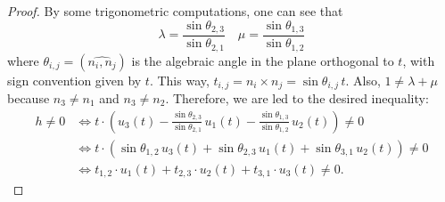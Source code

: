 \documentclass[11pt]{article}
\theoremstyle{plain}
\theoremstyle{definition}
\theoremstyle{remark}
\begin{document}
\begin{proof}
		By some trigonometric computations, one can see that
		\[\lambda = \frac{\sin \theta_{2,3}}{\sin \theta_{2,1}} \quad \mu = \frac{\sin \theta_{1,3}}{\sin \theta_{1,2}}\]
		where $\theta_{i,j} = (\widehat{n_i,n_j})$ is the algebraic angle in the plane orthogonal to $t$, with sign convention given by $t$. This way, $t_{i,j} = n_i \times n_j = \sin \theta_{i,j} \, t$. Also, $1 \neq \lambda + \mu$ because $n_3 \neq n_1$ and $n_3 \neq n_2$. 
		Therefore, we are led to the desired inequality:
		\begin{align*}
			h \neq 0 & \Leftrightarrow t \cdot \left(u_3(t) - \frac{\sin \theta_{2,3}}{\sin \theta_{2,1}}  \, u_1(t) - \frac{\sin \theta_{1,3}}{\sin \theta_{1,2}} \, u_2(t) \right) \neq 0 \\
			& \Leftrightarrow t \cdot \left( \sin \theta_{1,2} \, u_3(t) + \sin \theta_{2,3} \, u_1(t) + \sin \theta_{3,1} \, u_2(t) \right) \neq 0 \\
			& \Leftrightarrow t_{1,2} \cdot u_1(t) + t_{2,3} \cdot u_2(t) + t_{3,1} \cdot u_3(t) \neq 0.
		\end{align*}
		
	\end{proof}
	
	
\end{document}
